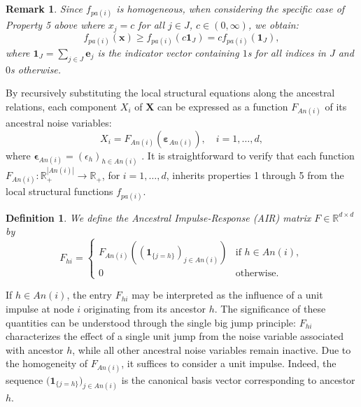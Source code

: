 \documentclass[10pt]{article}
\newtheorem{definition}[theorem]{Definition}
\newtheorem{remark}[theorem]{Remark}
\begin{document}
\begin{remark}
Since $f_{pa(i)}$ is   homogeneous, when considering the specific case of Property 5 above where $x_j = c$ for all $j \in J$, $c\in (0,\infty)$, we obtain:
\begin{equation}\label{eq:monotone imp}
    f_{pa(i)}(\mathbf{x}) \ge f_{pa(i)}(c \mathbf{1}_J) = c f_{pa(i)}(\mathbf{1}_J),
\end{equation}
where $\mathbf{1}_J = \sum_{j \in J} \mathbf{e}_j$ is the indicator vector containing $1$s for all indices in $J$ and $0$s otherwise.
\end{remark}

By recursively substituting the local structural equations along the ancestral relations, each component $X_i$ of $\boldsymbol{X}$ can be expressed as a function $F_{{An}(i)}$ of its ancestral noise variables:
\begin{equation}\label{eq:anc agg}
    X_i = F_{{An}(i)} (\boldsymbol{\varepsilon}_{An(i)}), \quad i=1,\dots,d,
\end{equation}
where $\boldsymbol{\epsilon}_{An(i)}= (\epsilon_h)_{h \in An(i)}$ . It is straightforward to verify that each function $F_{{An}(i)} \colon \mathbb{R}_+^{|An(i)|} \to \mathbb{R}_+$, for $i=1, \dots, d$, inherits properties 1 through 5 from the local structural functions $f_{{pa}(i)}$.


\begin{definition}\label{Def:AIR}
    We define the Ancestral Impulse-Response  (AIR) matrix  $F \in \mathbb{R}^{d \times d}$ by  
\[
    F_{hi} = \begin{cases} 
        F_{{An}(i)}\!\left( (\mathbf{1}_{\{j=h\}})_{j \in {An}(i)} \right) & \text{if } h \in {An}(i), \\
        0 & \text{otherwise.}
    \end{cases}
\]
\end{definition}
If $h\in  An(i)$, the entry $F_{hi}$ may be interpreted as the influence of a unit impulse at node $i$ originating from its ancestor $h$. The significance of these quantities can be understood through the single big jump principle: $F_{hi}$ characterizes the effect of a single unit jump from the noise variable associated with ancestor $h$, while all other ancestral noise variables remain inactive. Due to the homogeneity of $F_{{An}(i)}$, it suffices to consider  a unit impulse.
 Indeed, the sequence $\bigl(\mathbf{1}_{\{j=h\}}\bigr)_{j\in{An}(i)}$ is the canonical basis vector corresponding to ancestor $h$. 
\end{document}
